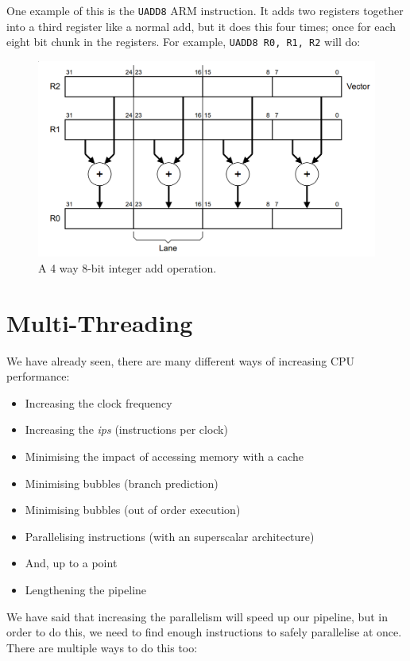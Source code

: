One example of this is the \texttt{UADD8} ARM instruction. It adds two registers
together into a third register like a normal add, but it does this four times;
once for each eight bit chunk in the registers. For example, \texttt{UADD8 R0,
R1, R2} will do:

\begin{figure}[H]
  \centering
  \includegraphics[width=\textwidth]{images/UADD8}
  \caption{A 4 way 8-bit integer add operation.}
  \label{UADD8}
\end{figure}

\section{Multi-Threading}

We have already seen, there are many different ways of increasing CPU
performance:

\begin{itemize}
  \item Increasing the clock frequency
  \item Increasing the \textit{ips} (instructions per clock)
  \item Minimising the impact of accessing memory with a cache
  \item Minimising bubbles (branch prediction)
  \item Minimising bubbles (out of order execution)
  \item Parallelising instructions (with an superscalar architecture)
  \item[ ] \hspace{-2.2em}And, up to a point
  \item Lengthening the pipeline
\end{itemize}

We have said that increasing the parallelism will speed up our pipeline, but in
order to do this, we need to find enough instructions to safely parallelise at
once. There are multiple ways to do this too:

